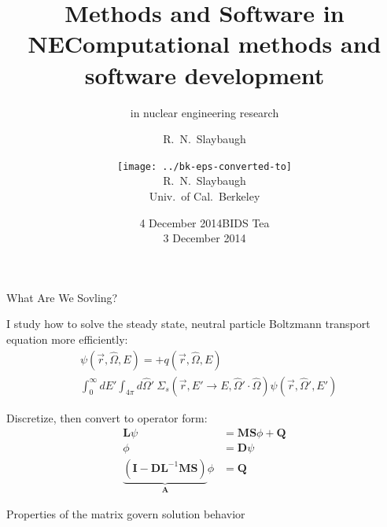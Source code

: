\documentclass[xcolor=x11names,compress]{beamer}
\title{Methods and Software in NE}
\author{R.\ N.\ Slaybaugh}
\date{4 December 2014}
\renewcommand{\(}{\begin{columns}}
\renewcommand{\)}{\end{columns}}
\newcommand{\<}[1]{\begin{column}{#1}}
\renewcommand{\>}{\end{column}}
\newcommand{\Macro}{\ensuremath{\Sigma}}
\newcommand{\vOmega}{\ensuremath{\hat{\Omega}}}
\newcommand{\ve}[1]{\ensuremath{\mathbf{#1}}}
\begin{document}
\begin{frame}
\title{Computational methods and software development }
\subtitle{in nuclear engineering research}
\author{
        \texttt{[image: ../bk-eps-converted-to]}\\R.\ N.\ Slaybaugh \\ Univ.\ of Cal.\ Berkeley}

\date{BIDS Tea \\ 3 December 2014}
\titlepage
\end{frame}

\begin{frame}{What Are We Sovling?}

    I study how to solve the steady state, neutral particle Boltzmann transport equation
    more efficiently:
    \begin{align}
    [\vOmega \cdot \nabla + \Macro(\vec{r}, E)] &\psi(\vec{r}, \vOmega, E)  =  + q(\vec{r}, \vOmega, E) \nonumber\\
     &\int_0^{\infty} dE' \int_{4\pi} d\vOmega' \:\Macro_{s}(\vec{r}, E' \to E,
     \vOmega' \cdot \vOmega) \psi(\vec{r}, \vOmega', E') \nonumber
    \end{align}

    Discretize, then convert to operator form:
    \begin{align}
    \mathbf{L} \psi &= \mathbf{MS}\phi + \mathbf{Q} \nonumber\\
    \phi &= \mathbf{D}\psi \nonumber \\
    \underbrace{(\ve{I} - \ve{DL}^{-1}\ve{MS})}_{\mathbf{A}}\phi &= \mathbf{Q}\nonumber
    \end{align}
    
    \textcolor{dgreen}{Properties of the matrix} govern solution behavior
    
\end{frame}
\end{document}
